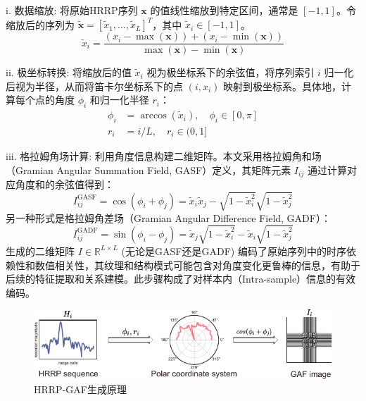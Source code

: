 i.  数据缩放: 将原始HRRP序列 $\mathbf{x}$ 的值线性缩放到特定区间，通常是 $[-1, 1]$。令缩放后的序列为 $\tilde{\mathbf{x}} = [\tilde{x}_1, \dots, \tilde{x}_L]^T$，其中 $\tilde{x}_i \in [-1, 1]$。
    \begin{equation}
        \tilde{x}_i = \frac{(x_i - \max(\mathbf{x})) + (x_i - \min(\mathbf{x}))}{\max(\mathbf{x}) - \min(\mathbf{x})}
        \label{eq:gaf_scaling}
    \end{equation}
    
ii.  极坐标转换: 将缩放后的值 $\tilde{x}_i$ 视为极坐标系下的余弦值，将序列索引 $i$ 归一化后视为半径，从而将笛卡尔坐标系下的点 $(i, x_i)$ 映射到极坐标系。具体地，计算每个点的角度 $\phi_i$ 和归一化半径 $r_i$：
    \begin{align}
        \phi_i &= \arccos(\tilde{x}_i), \quad \phi_i \in [0, \pi] \label{eq:gaf_angle} \\
        r_i &= i / L, \quad r_i \in (0, 1] \label{eq:gaf_radius}
    \end{align}
    
iii.  格拉姆角场计算: 利用角度信息构建二维矩阵。本文采用格拉姆角和场（Gramian Angular Summation Field, GASF）定义，其矩阵元素 $I_{ij}$ 通过计算对应角度和的余弦值得到：
    \begin{equation}
        I_{ij}^{\text{GASF}} = \cos(\phi_i + \phi_j) = \tilde{x}_i \tilde{x}_j - \sqrt{1-\tilde{x}_i^2} \sqrt{1-\tilde{x}_j^2}
        \label{eq:gaf_gasf}
    \end{equation}
    另一种形式是格拉姆角差场（Gramian Angular Difference Field, GADF）：
    \begin{equation}
        I_{ij}^{\text{GADF}} = \sin(\phi_i - \phi_j) = \tilde{x}_j \sqrt{1-\tilde{x}_i^2} - \tilde{x}_i \sqrt{1-\tilde{x}_j^2}
        \label{eq:gaf_gadf}
    \end{equation}
    生成的二维矩阵 $I \in \mathbb{R}^{L \times L}$ (无论是GASF还是GADF) 编码了原始序列中的时序依赖性和数值相关性，其纹理和结构模式可能包含对角度变化更鲁棒的信息，有助于后续的特征提取和关系建模。此步骤构成了对样本内（Intra-sample）信息的有效编码。

\begin{figure}[h]
    \centering
    \includegraphics[width=0.8\linewidth]{figures/gaf.pdf}
    \caption{HRRP-GAF生成原理}
    \label{fig:dataset_chap3}
\end{figure}

